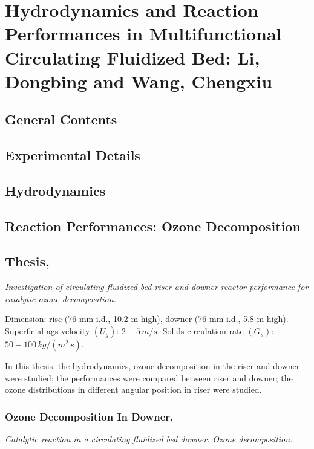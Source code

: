 %
%
%
\chapter{Hydrodynamics and Reaction Performances in Multifunctional Circulating Fluidized Bed: Li, Dongbing and Wang, Chengxiu}
\section{General Contents}

\section{Experimental Details}

\section{Hydrodynamics}

\section{Reaction Performances: Ozone Decomposition}



\section[Li, Dongbing, 2010]{Thesis, \citep{li2010}}
\textit{Investigation of circulating fluidized bed riser and downer reactor performance for catalytic ozone decomposition.}

Dimension: rise (76 mm i.d., 10.2 m high), downer (76 mm i.d., 5.8 m high). Superficial ags velocity $(U_g)$: $2-5\,\si{m/s}$. 
Solids circulation rate $(G_s)$: $50-100\,\si{kg/(m^2\,s)}$.

In this thesis, the hydrodynamics, ozone decomposition in the riser and downer were studied; 
the performances were compared between riser and downer; 
the ozone distributions in different angular position in riser were studied.

\subsection[Ozone Decomposition In Downer, 2011]{Ozone Decomposition In Downer, \citep{li2011catalytic}}
\textit{Catalytic reaction in a circulating fluidized bed downer: Ozone decomposition.}

